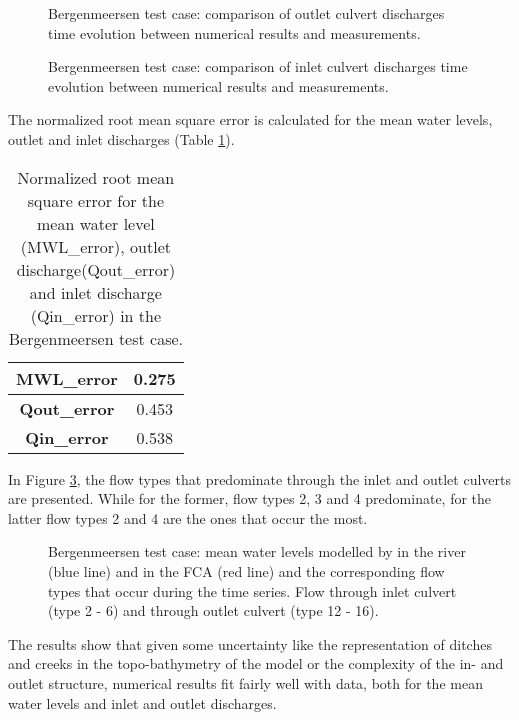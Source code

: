 \begin{figure}[H]
\begin{center}
\end{center}
\caption{Bergenmeersen test case: comparison of outlet culvert discharges time evolution between numerical results and measurements.}
\label{fig:bergenmeersen_figure7}
\end{figure}
\begin{figure}[H]
\begin{center}
\end{center}
\caption{Bergenmeersen test case: comparison of inlet culvert discharges time evolution between numerical results and measurements.}
\label{fig:bergenmeersen_figure8}
\end{figure}

The normalized root mean square error is calculated for the mean water levels, outlet and inlet discharges (Table \ref{tab:bergenmeersen_table3}).

\begin{table}[H]
\caption{Normalized root mean square error for the mean water level (MWL\_error),
outlet discharge(Qout\_error) and inlet discharge (Qin\_error)
in the Bergenmeersen test case.}\label{tab:bergenmeersen_table3}
\begin{center}\begin{tabular}{|c|c|}
\hline
\textbf{MWL\_error} & 0.275\\
\hline
\textbf{Qout\_error} & 0.453 \\
\hline
\textbf{Qin\_error} & 0.538 \\
\hline
\end{tabular}\end{center}
\end{table}

In Figure \ref{fig:bergenmeersen_figure9}, the flow types that predominate
through the inlet and outlet culverts are presented.
While for the former, flow types 2, 3 and 4 predominate, for the latter flow
types 2 and 4 are the ones that occur the most.

\begin{figure}[H]
\begin{center}
\end{center}
\caption{Bergenmeersen test case: mean water levels modelled by  in the river (blue line)
and in the FCA (red line) and the corresponding flow types that occur during the time series.
Flow through inlet culvert (type 2 - 6) and through outlet culvert (type 12 - 16).}
\label{fig:bergenmeersen_figure9}
\end{figure}

The results show that given some uncertainty like the representation of ditches
and creeks in the topo-bathymetry of the model
or the complexity of the in- and outlet structure, numerical results fit fairly
well with data,
both for the mean water levels and inlet and outlet discharges.
